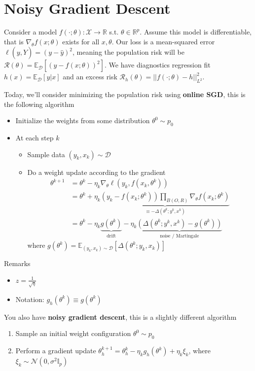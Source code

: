 \section{Noisy Gradient Descent}
Consider a model $f(\cdot; \theta): \mathcal X \to \mathbb R$ s.t. $\theta \in \mathbb R^p$. Assume this model is differentiable, that is $\nabla_\theta f(x; \theta)$ exists for all $x,\theta$. Our loss is a mean-squared error $\ell(y , \hat Y) = (y - \hat y)^2$, meaning the population risk will be $\mathcal R(\theta) = \mathbb E_{\mathcal D}[(y - f(x;\theta))^2]$. We have diagnostics regression fit $h(x) = \mathbb E_{\mathcal D}[y  |x]$ and an excess risk $\mathcal R_h (\theta) = ||f(\cdot;\theta) - h||^2_{L^2}$.

Today, we'll consider minimizing the population risk using \textbf{online SGD}, this is the following algorithm
\begin{itemize}
	\item Initialize the weights from some distribution $\theta^0 \sim p_0$
	\item At each step $k$
	\begin{itemize}
		\item Sample data $(y_k, x_k)\sim \mathcal D$
		\item Do a weight update according to the gradient 
		\begin{align}
			\theta^{k+1} & = \theta^{k} - \eta_k \nabla_\theta \ell(y_k, f(x_k, \theta^k))\\
			& = \theta^k + \eta_k \underbrace{(y_k - f(x_k ; \theta^k)) \prod_{B(O,R)} \nabla_\theta f(x_k; \theta^k)}_{\equiv - \Delta (\theta^k; y^k , x^k)}\\
			& = \theta^k - \eta_k \underbrace{g(\theta^k)}_{\text{drift}} - \eta_k \underbrace{(\Delta(\theta^k; y^k, x^k) - g(\theta^k))}_{\text{noise / Martingale}}
		\end{align}
		where $g(\theta^k) = \mathbb E_{(y_k, x_k) \sim \mathcal D}[\Delta(\theta^k ; y_k, x_k)]$
	\end{itemize} 
\end{itemize}
Remarks
\begin{itemize}
	\item $z = \frac{1}{\sqrt{\eta}}$
	\item Notation: $g_h(\theta^k) \equiv g(\theta^k)$
\end{itemize}
You also have \textbf{noisy gradient descent}, this is a slightly different algorithm
\begin{enumerate}
	\item Sample an initial weight configuration $\theta^0 \sim p_0$
	\item Perform a gradient update $\theta_h^{k+1} = \theta_h^{k} - \eta_k g_h(\theta^k) + \eta_k \xi_k$, where $\xi_k \sim \mathcal N(0, \sigma^2 \mathbb I_p)$
\end{enumerate}
